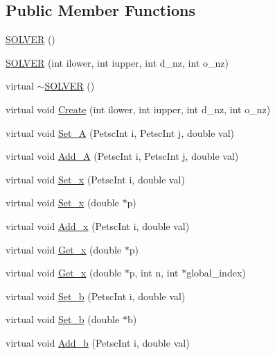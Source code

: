 \subsection*{Public Member Functions}
\begin{DoxyCompactItemize}
\item 
\hyperlink{class_s_o_l_v_e_r_a0899c454a0d6da62cda51b490aa90404}{S\+O\+L\+V\+ER} ()
\item 
\hyperlink{class_s_o_l_v_e_r_a7ce2ca4fbe4e937b730480c4af7e6a69}{S\+O\+L\+V\+ER} (int ilower, int iupper, int d\+\_\+nz, int o\+\_\+nz)
\item 
virtual \hyperlink{class_s_o_l_v_e_r_acfe5550e181128b25df18ee3af578900}{$\sim$\+S\+O\+L\+V\+ER} ()
\item 
virtual void \hyperlink{class_s_o_l_v_e_r_a6f26872410904e12b41f38a698c77142}{Create} (int ilower, int iupper, int d\+\_\+nz, int o\+\_\+nz)
\item 
virtual void \hyperlink{class_s_o_l_v_e_r_a3d9db786eca3291779e28cac3b668fb7}{Set\+\_\+A} (Petsc\+Int i, Petsc\+Int j, double val)
\item 
virtual void \hyperlink{class_s_o_l_v_e_r_acab7042ca8fa773d819eecbf26610e79}{Add\+\_\+A} (Petsc\+Int i, Petsc\+Int j, double val)
\item 
virtual void \hyperlink{class_s_o_l_v_e_r_af8ba0a377b1086dd0a8f81cd1257b9df}{Set\+\_\+x} (Petsc\+Int i, double val)
\item 
virtual void \hyperlink{class_s_o_l_v_e_r_a6ec5fdde60f17926fd8d2e51b9c8a936}{Set\+\_\+x} (double $\ast$p)
\item 
virtual void \hyperlink{class_s_o_l_v_e_r_a20fbb067853a35da80175e3f0a7f676f}{Add\+\_\+x} (Petsc\+Int i, double val)
\item 
virtual void \hyperlink{class_s_o_l_v_e_r_a4cf5cb08ba39fec651afe9f79fd02a5e}{Get\+\_\+x} (double $\ast$p)
\item 
virtual void \hyperlink{class_s_o_l_v_e_r_ada1baf0233120aeda1d03bb560aa2593}{Get\+\_\+x} (double $\ast$p, int n, int $\ast$global\+\_\+index)
\item 
virtual void \hyperlink{class_s_o_l_v_e_r_afa83e8d19073a356c3c5ccdbf888fa0f}{Set\+\_\+b} (Petsc\+Int i, double val)
\item 
virtual void \hyperlink{class_s_o_l_v_e_r_a0f19af9d19b9b2c6c51449490ca66e8b}{Set\+\_\+b} (double $\ast$b)
\item 
virtual void \hyperlink{class_s_o_l_v_e_r_a4d0f29e6764e470b50067a1b1696985a}{Add\+\_\+b} (Petsc\+Int i, double val)
\item 

\end{DoxyCompactItemize}
